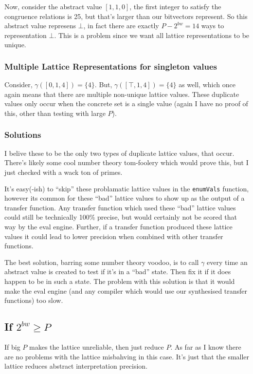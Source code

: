 \documentclass[12pt]{article}
\begin{document}
Now, consider the abstract value $[1, 1, 0]$, the first integer to satisfy the congruence relations is 25, but that's larger than our bitvectors represent.
So this abstract value represens $\bot$, in fact there are exactly $P - 2^{bw} = 14$ ways to representation $\bot$.
This is a problem since we want all lattice representations to be unique.

\subsubsection{Multiple Lattice Representations for singleton values}
Consider, $\gamma([0, 1, 4]) = \{4\}$.
But, $\gamma([\top, 1, 4]) = \{4\}$ as well, which once again means that there are multiple non-unique lattice values.
These duplicate values only occur when the concrete set is a single value (again I have no proof of this, other than testing with large $P$).

\subsubsection{Solutions}
I belive these to be the only two types of duplicate lattice values, that occur.
There's likely some cool number theory tom-foolery which would prove this, but I just checked with a wack ton of primes.

It's easy(-ish) to ``skip'' these problamatic lattice values in the \texttt{enumVals} function,
however its common for these ``bad'' lattice values to show up as the output of a transfer function.
Any transfer function which used these ``bad'' lattice values could still be technically 100\% precise,
but would certainly not be scored that way by the eval engine.
Further, if a transfer function produced these lattice values it could lead to lower precision when combined with other transfer functions.

The best solution, barring some number theory voodoo, is to call $\gamma$ every time an abstract value is created to test if it's in a ``bad'' state.
Then fix it if it does happen to be in such a state.
The problem with this solution is that it would make the eval engine (and any compiler which would use our synthesised transfer functions) too slow.

\subsection{If $2^{bw} \geq P$}

If big $P$ makes the lattice unreliable, then just reduce $P$.
As far as I know there are no problems with the lattice misbahving in this case.
It's just that the smaller lattice reduces abstract interpretation precision.
\end{document}
